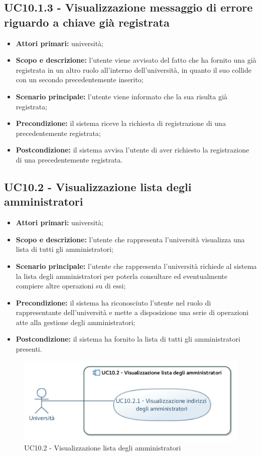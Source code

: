 \documentclass[AnalisiDeiRequisiti.tex]{subfiles}
\begin{document}
\subsection{UC10.1.3 - Visualizzazione messaggio di errore riguardo a chiave già registrata}
\begin{itemize}
	\item \textbf{Attori primari:} università;
	\item \textbf{Scopo e descrizione:} l'utente viene avvisato del fatto che ha fornito una  già registrata in un altro ruolo all'interno dell'università, in quanto il suo  collide con un secondo precedentemente inserito;
	\item \textbf{Scenario principale:} l'utente viene informato che la sua  risulta già registrata;
	\item \textbf{Precondizione:} il sistema riceve la richiesta di registrazione di una  precedentemente registrata;
	\item \textbf{Postcondizione:} il sistema avvisa l'utente di aver richiesto la registrazione di una  precedentemente registrata.
\end{itemize}


\subsection{UC10.2 - Visualizzazione lista degli amministratori}
\begin{itemize}
	\item \textbf{Attori primari:} università;
	\item \textbf{Scopo e descrizione:} l'utente che rappresenta l'università visualizza una lista di tutti gli amministratori;
	\item \textbf{Scenario principale:} l'utente che rappresenta l'università richiede al sistema la lista degli amministratori per poterla consultare ed eventualmente compiere altre operazioni su di essi;
	\item \textbf{Precondizione:} il sistema ha riconosciuto l'utente nel ruolo di rappresentante dell'università e mette a disposizione una serie di operazioni atte alla gestione degli amministratori; 
	\item \textbf{Postcondizione:} il sistema ha fornito la lista di tutti gli amministratori presenti.
\end{itemize}

\begin{figure}[H]
	\centering
	\includegraphics[width=0.7\linewidth]{UC10_2.jpg}
	\caption{UC10.2 - Visualizzazione lista degli amministratori}
	\label{UC10.2 - Visualizzazione lista degli amministratori}
\end{figure}
\end{document}
